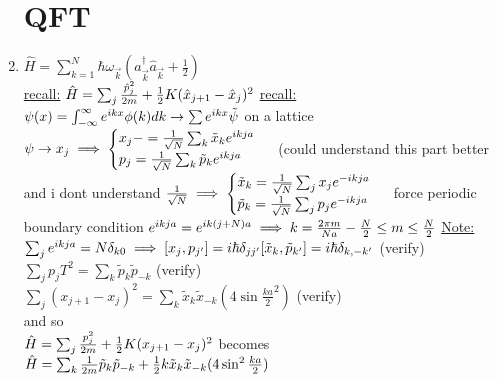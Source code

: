 \documentclass[12pt]{amsart}
\begin{document}
\begin{enumerate}
\section*{QFT}
\item \underline{$\hat{H} = \sum_{k=1}^N \hbar \omega_{\vec{k}} (\hat{a}_{\vec{k}}^{\dagger} \hat{a}_{\vec{k}} + \frac{1}{2})$}\\
\underline{recall:} $\hat{H} = \sum_j \frac{\hat{p}_j^2}{2m} + \frac{1}{2} K ( \hat{x}_{j+1} - \hat{x}_j)^2\\$
\underline{recall:} $\psi(x) = \int_{- \infty}^{\infty} e^{ik x} \phi (k) dk \rightarrow \sum e^{ik x} \tilde{\psi}\\$
on a lattice $\psi \rightarrow x_j\\
\implies \begin{cases} x_j -= \frac{1}{\sqrt{N}} \sum_k \tilde{x}_k e^{i k j a}\\ p_j = \frac{1}{\sqrt{N}} \sum_k \tilde{p}_k e^{ik ja} \end{cases}\\$
(could understand this part better and i dont understand $\frac{1}{\sqrt{N}}
\implies \begin{cases} \tilde{x}_k = \frac{1}{\sqrt{N}} \sum_j x_j e^{- i k j a}\\ \tilde{p}_k = \frac{1}{\sqrt{N}} \sum_j p_j e^{-i k ja} \end{cases}\\$
force periodic boundary condition $e^{ik ja} = e^{i k(j+N)a} \implies k= \frac{2 \pi m}{Na }\\
- \frac{N}{2} \leq m \leq \frac{N}{2}\\$
\underline{Note:} $\sum_j e^{i k j a} = N \delta_{k0}\\
\implies [x_j, p_{j'} ] = i \hbar \delta_{j j'}\\
{[\tilde{x}_k, \tilde{p}_{k'} ]} = i \hbar \delta_{k, -k'}$ (verify)\\
$\sum_j p_jT^2 = \sum_k \tilde{p}_k \tilde{p}_{-k}$ (verify)\\
$\sum_j ( x_{j+1} - x_j)^2 = \sum_k \tilde{x}_k \tilde{x}_{-k} ( 4 \sin \frac{ka}{2}^2)$ (verify)\\
and so \\
$\hat{H} = \sum_j \frac{p_j^2}{2m} + \frac{1}{2} K (x_{j+1} - x_j)^2\\$
becomes\\
$\hat{H} = \sum_k \frac{1}{2m} \tilde{p}_k \tilde{p}_{-k} + \frac{1}{2} k \tilde{x}_k \tilde{x}_{-k} (4 \sin^2 \frac{ka}{2})\\$

\end{enumerate}
\end{document}

